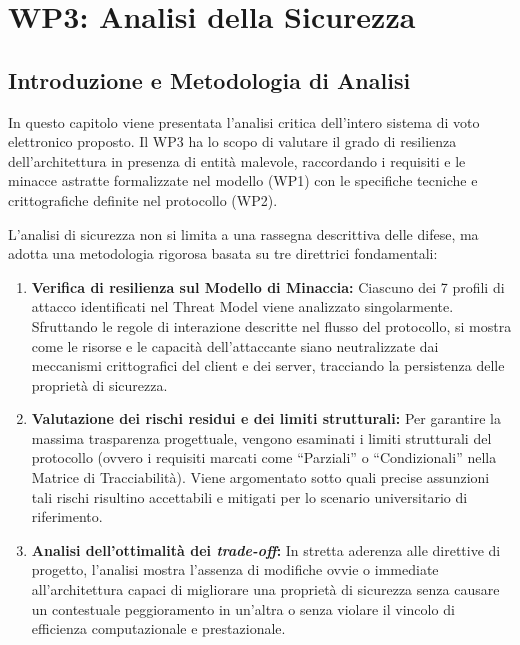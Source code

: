 \chapter{WP3: Analisi della Sicurezza}
\label{ch:wp3}

\section{Introduzione e Metodologia di Analisi}
\label{sec:3.1_introduzione}

In questo capitolo viene presentata l'analisi critica dell'intero sistema di voto elettronico proposto. Il WP3 ha lo scopo di valutare il grado di resilienza dell'architettura in presenza di entità malevole, raccordando i requisiti e le minacce astratte formalizzate nel modello (WP1) con le specifiche tecniche e crittografiche definite nel protocollo (WP2).

L'analisi di sicurezza non si limita a una rassegna descrittiva delle difese, ma adotta una metodologia rigorosa basata su tre direttrici fondamentali:

\begin{enumerate}
    \item \textbf{Verifica di resilienza sul Modello di Minaccia:} Ciascuno dei 7 profili di attacco identificati nel Threat Model viene analizzato singolarmente. Sfruttando le regole di interazione descritte nel flusso del protocollo, si mostra come le risorse e le capacità dell'attaccante siano neutralizzate dai meccanismi crittografici del client e dei server, tracciando la persistenza delle proprietà di sicurezza.
    \item \textbf{Valutazione dei rischi residui e dei limiti strutturali:} Per garantire la massima trasparenza progettuale, vengono esaminati i limiti strutturali del protocollo (ovvero i requisiti marcati come ``Parziali'' o ``Condizionali'' nella Matrice di Tracciabilità). Viene argomentato sotto quali precise assunzioni tali rischi risultino accettabili e mitigati per lo scenario universitario di riferimento.
    \item \textbf{Analisi dell'ottimalità dei \textit{trade-off}:} In stretta aderenza alle direttive di progetto, l'analisi mostra l'assenza di modifiche ovvie o immediate all'architettura capaci di migliorare una proprietà di sicurezza senza causare un contestuale peggioramento in un'altra o senza violare il vincolo di efficienza computazionale e prestazionale.
\end{enumerate}

